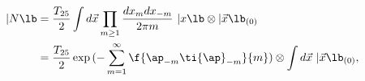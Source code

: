 \begin{equation}
\begin{split}
|N\lb&=\frac{T_{25}}{2}\int d\vec{x} \prod_{m\geq 1}\frac{dx_{m}dx_{-m}}
{2\pi m}\ 
|x \lb\otimes |\vec{x} \lb_{(0)}\\&=\frac{T_{25}}{2}
\exp{(-\sum_{m=1}^{\infty}\f{\ap_{-m}\ti{\ap}_{-m}}{m})}
\otimes \int d\vec{x}\ |\vec{x} \lb_{(0)},
\end{split}
\end{equation}

